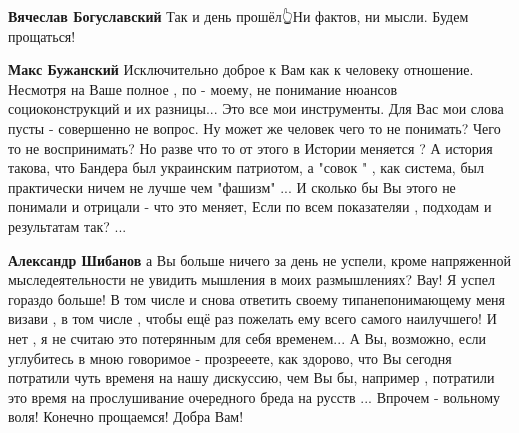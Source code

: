 \begin{itemize}
\begin{itemize}
 
\textbf{Вячеслав Богуславский} Так и день прошёл👆Ни фактов, ни мысли. Будем прощаться!

 
\textbf{Макс Бужанский} Исключительно доброе к Вам как к человеку отношение. \Smiley[1.0][yellow]
Несмотря на Ваше полное , по - моему, не понимание нюансов социоконструкций и
их разницы... Это все мои инструменты. \Smiley[1.0][yellow] Для Вас мои слова пусты - совершенно
не вопрос. Ну может же человек чего то не понимать? \Smiley[1.0][yellow] Чего то не воспринимать?
\Smiley[1.0][yellow] Но разве что то от этого в Истории меняется ? \Smiley[1.0][yellow] А история такова, что
Бандера был украинским патриотом, а "совок " , как система, был практически
ничем не лучше чем "фашизм" ... И сколько бы Вы этого не понимали и отрицали -
что это меняет, Если по всем показателяи , подходам и результатам так? ...

 
\textbf{Александр Шибанов} а Вы больше ничего за день не успели, кроме
напряженной мыследеятельности не увидить мышления в моих размышлениях? \Smiley[1.0][yellow] Вау!
\Smiley[1.0][yellow] Я успел гораздо больше! \Smiley[1.0][yellow] В том числе и снова ответить своему
типанепонимающему меня визави , в том числе , чтобы ещё раз пожелать ему всего
самого наилучшего! \Smiley[1.0][yellow] И нет , я не считаю это потерянным для себя временем... А
Вы, возможно, если углубитесь в мною говоримое - прозрееете, как здорово, что
Вы сегодня потратили чуть временя на нашу дискуссию, чем Вы бы, например ,
потратили это время на прослушивание очередного бреда на русств ... Впрочем -
вольному воля! \Smiley[1.0][yellow] Конечно прощаемся! Добра Вам! \Smiley[1.0][yellow]


\end{itemize}
\end{itemize}
